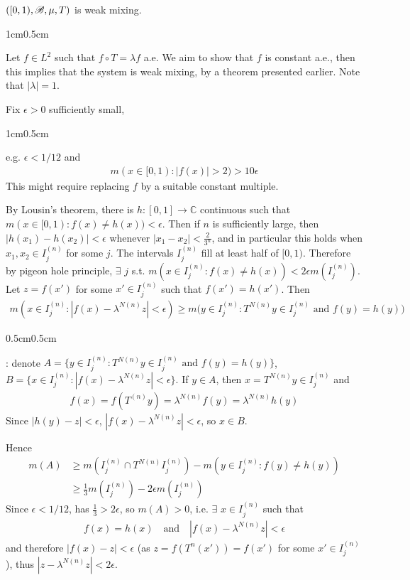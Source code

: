 \documentclass[10pt,a4paper]{report}
\newenvironment{proof}
{\begin{changemargin}{1cm}{0.5cm} 
	}%
	{\end{changemargin}
}
\newenvironment{subproof}
{\begin{changemargin}{0.5cm}{0.5cm}
	}%
	{\end{changemargin}
}
\begin{document}
\thm  $([0,1), \mathscr{B}, \mu, T)$ is weak mixing.
\begin{proof}
\pf Let $f\in L^2$ such that $f\circ T = \lambda f$ a.e. We aim to show that $f$ is constant a.e., then this implies that the system is weak mixing, by a theorem presented earlier. Note that $|\lambda| =1$.

\quad Fix $\epsilon >0$ sufficiently small,
\begin{proof}
e.g. $\epsilon < 1/12$ and
\begin{align*}
m(x\in [0,1) : |f(x)| >2) > 10\epsilon
\end{align*}
This might require replacing $f$ by a suitable constant multiple. 
\end{proof}
By Lousin's theorem, there is $h :[0,1] \rightarrow \mathbb{C}$ continuous such that $m(x\in [0,1) : f(x) \neq h(x)) < \epsilon$. Then if $n$ is sufficiently large, then $|h(x_1)-h(x_2)| < \epsilon$ whenever $|x_1 - x_2| < \frac{2}{3^n}$, and in particular this holds  when $x_1,x_2 \in I_j^{(n)}$ for some $j$. The intervals $I^{(n)}_j$ fill at least half of $[0,1)$. Therefore by pigeon hole principle, $\exists$ $j$ s.t. $m(x\in I^{(n)}_j : f(x) \neq h(x)) < 2\epsilon m(I^{(n)}_j)$. Let $z = f(x')$ for some $x' \in I^{(n)}_j$ such that $f(x') = h(x')$. Then
\begin{align*}
m(x\in I^{(n)}_j : |f(x) - \lambda^{N(n)}z| < \epsilon) \geq m\big( y \in I^{(n)}_j : T^{N(n)} y \in I^{(n)}_j \text{ and } f(y) = h(y) \big) 
\end{align*}
\begin{subproof}
: denote $A = \{ y \in I^{(n)}_j : T^{N(n)} y \in I^{(n)}_j \text{ and } f(y) = h(y) \}$, $B = \{ x\in I^{(n)}_j : |f(x) - \lambda^{N(n)}z| < \epsilon\}$. If $y\in A$, then $x = T^{N(n)} y \in I^{(n)}_j$ and 
\begin{align*}
f(x) = f(T^{(n)} y) = \lambda^{N(n)} f(y) = \lambda^{N(n)} h(y)
\end{align*}
Since $|h(y)-z| < \epsilon$, $|f(x) - \lambda^{N(n)}z| < \epsilon$, so $x\in B$. 
\end{subproof}
Hence
\begin{align*}
m(A) & \geq m(I_j^{(n)} \cap T^{N(n)}I^{(n)}_j)  - m(y \in I^{(n)}_j : f(y) \neq h(y)) \\
& \geq \frac{1}{3} m(I^{(n)}_j) - 2\epsilon m(I^{(n)}_j)
\end{align*}
Since $\epsilon < 1/12$, has $\frac{1}{3} > 2\epsilon$, so $m(A) >0$, i.e. $\exists$ $x\in I^{(n)}_j$ such that
\begin{align*}
f(x)  = h(x) \quad \text{and} \quad |f(x) - \lambda^{N(n)} z| < \epsilon
\end{align*}
and therefore $|f(x)-z| < \epsilon$ (as $z = f(T^n( x')) = f(x')$ for some $x' \in I^{(n)}_j$), thus $|z-\lambda^{N(n)}z| < 2\epsilon$.


\end{proof}
\end{document}

